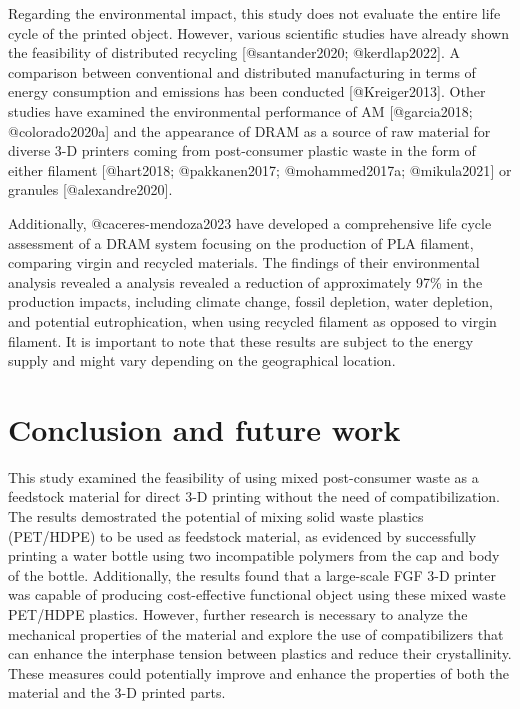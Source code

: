 \documentclass[
  letterpaper,
  DIV=11,
  numbers=noendperiod]{scrartcl}
\begin{document}
Regarding the environmental impact, this study does not evaluate the
entire life cycle of the printed object. However, various scientific
studies have already shown the feasibility of distributed recycling
{[}@santander2020; @kerdlap2022{]}. A comparison between conventional
and distributed manufacturing in terms of energy consumption and
emissions has been conducted {[}@Kreiger2013{]}. Other studies have
examined the environmental performance of AM {[}@garcia2018;
@colorado2020a{]} and the appearance of DRAM as a source of raw material
for diverse 3-D printers coming from post-consumer plastic waste in the
form of either filament {[}@hart2018; @pakkanen2017; @mohammed2017a;
@mikula2021{]} or granules {[}@alexandre2020{]}.

Additionally, @caceres-mendoza2023 have developed a comprehensive life
cycle assessment of a DRAM system focusing on the production of PLA
filament, comparing virgin and recycled materials. The findings of their
environmental analysis revealed a analysis revealed a reduction of
approximately 97\% in the production impacts, including climate change,
fossil depletion, water depletion, and potential eutrophication, when
using recycled filament as opposed to virgin filament. It is important
to note that these results are subject to the energy supply and might
vary depending on the geographical location.

\hypertarget{conclusion-and-future-work}{%
\section{Conclusion and future work}\label{conclusion-and-future-work}}

This study examined the feasibility of using mixed post-consumer waste
as a feedstock material for direct 3-D printing without the need of
compatibilization. The results demostrated the potential of mixing solid
waste plastics (PET/HDPE) to be used as feedstock material, as evidenced
by successfully printing a water bottle using two incompatible polymers
from the cap and body of the bottle. Additionally, the results found
that a large-scale FGF 3-D printer was capable of producing
cost-effective functional object using these mixed waste PET/HDPE
plastics. However, further research is necessary to analyze the
mechanical properties of the material and explore the use of
compatibilizers that can enhance the interphase tension between plastics
and reduce their crystallinity. These measures could potentially improve
and enhance the properties of both the material and the 3-D printed
parts.
\end{document}
